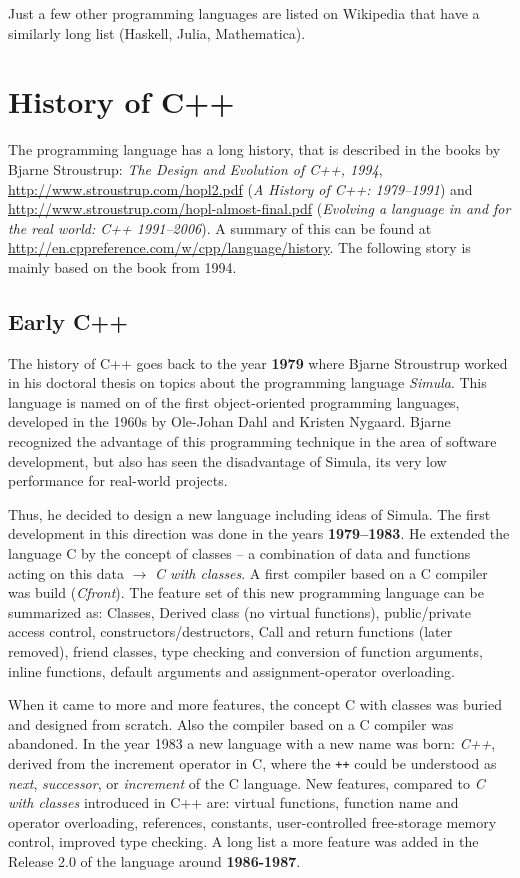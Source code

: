 Just a few other programming languages are listed on Wikipedia that have a similarly long list (Haskell, Julia, Mathematica).


\section{History of C++}
The programming language has a long history, that is described in the books by Bjarne Stroustrup: \emph{The Design and Evolution of C++, 1994},
\url{http://www.stroustrup.com/hopl2.pdf} (\emph{A History of C++: 1979--1991}) and \url{http://www.stroustrup.com/hopl-almost-final.pdf}
(\emph{Evolving a language in and for the real world: C++ 1991--2006}). A summary of this can be found at
\url{http://en.cppreference.com/w/cpp/language/history}. The following story is mainly based on the book from 1994.

\subsection{Early C++}
The history of C++ goes back to the year \textbf{1979} where Bjarne Stroustrup worked in his doctoral thesis on topics about the
programming language \emph{Simula}. This language is named on of the first object-oriented programming languages, developed in the
1960s by Ole-Johan Dahl and Kristen Nygaard. Bjarne recognized the advantage of this programming technique in the area of software
development, but also has seen the disadvantage of Simula, its very low performance for real-world projects.

Thus, he decided to design a new language including ideas of Simula. The first development in this direction was done in the years
\textbf{1979--1983}. He extended the language C by the concept of classes -- a combination of data and functions acting on this data
$\rightarrow$ \textit{C with classes}. A first compiler based on a C compiler was build (\textit{Cfront}). The feature set of this new
programming language can be summarized as: Classes, Derived class (no virtual functions), public/private access control,
constructors/destructors, Call and return functions (later removed), friend classes, type checking and conversion of function arguments,
inline functions, default arguments and assignment-operator overloading.

When it came to more and more features, the concept C with classes was buried and designed from scratch. Also the compiler based on a C compiler
was abandoned. In the year 1983 a new language with a new name was born: \textit{C++}, derived from the increment operator in C, where the \texttt{++}
could be understood as \emph{next}, \emph{successor}, or \emph{increment} of the C language. New features, compared to \emph{C with classes} introduced
in C++ are: virtual functions, function name and operator overloading, references, constants, user-controlled free-storage memory control,
improved type checking. A long list a more feature was added in the Release 2.0 of the language around \textbf{1986-1987}.


